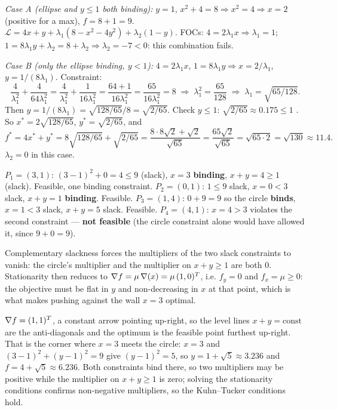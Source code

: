 \begin{solutions}
  \item \emph{Case A (ellipse and $y \leq 1$ both binding):} $y = 1$,
        $x^2 + 4 = 8 \Rightarrow x^2 = 4 \Rightarrow x = 2$ (positive for
        a max), $f = 8 + 1 = 9$.
        $\mathcal{L} = 4 x + y + \lambda_1(8 - x^2 - 4 y^2)
        + \lambda_2(1 - y)$. FOCs:
        $4 = 2 \lambda_1 x \Rightarrow \lambda_1 = 1$;
        $1 = 8 \lambda_1 y + \lambda_2 = 8 + \lambda_2 \Rightarrow
        \lambda_2 = -7 < 0$: this combination fails.

        \emph{Case B (only the ellipse binding, $y < 1$):}
        $4 = 2 \lambda_1 x$, $1 = 8 \lambda_1 y \Rightarrow
        x = 2/\lambda_1$, $y = 1/(8 \lambda_1)$. Constraint:
        \[
          \frac{4}{\lambda_1^2} + \frac{4}{64 \lambda_1^2}
          = \frac{4}{\lambda_1^2} + \frac{1}{16 \lambda_1^2}
          = \frac{64 + 1}{16 \lambda_1^2}
          = \frac{65}{16 \lambda_1^2} = 8
          \;\Rightarrow\; \lambda_1^2 = \frac{65}{128}
          \;\Rightarrow\; \lambda_1 = \sqrt{65/128} .
        \]
        Then $y = 1/(8 \lambda_1) = \sqrt{128/65}/8 = \sqrt{2/65}$. Check
        $y \leq 1$: $\sqrt{2/65} \approx 0.175 \leq 1$ \checkmark. So
        $x^* = 2 \sqrt{128/65}$, $y^* = \sqrt{2/65}$, and
        \[
          f^* = 4 x^* + y^*
              = 8 \sqrt{128/65} + \sqrt{2/65}
              = \frac{8 \cdot 8 \sqrt{2} + \sqrt{2}}{\sqrt{65}}
              = \frac{65 \sqrt{2}}{\sqrt{65}}
              = \sqrt{65 \cdot 2} = \sqrt{130} \approx 11.4 .
        \]
        $\lambda_2 = 0$ in this case.

  \item $P_{1}=(3,1)$: $(3-1)^{2}+0=4\le9$ (slack), $x=3$
        \textbf{binding}, $x+y=4\ge1$ (slack). Feasible, one binding
        constraint. \;$P_{2}=(0,1)$: $1\le9$ slack, $x=0<3$ slack,
        $x+y=1$ \textbf{binding}. Feasible. \;$P_{3}=(1,4)$:
        $0+9=9$ so the circle \textbf{binds}, $x=1<3$ slack, $x+y=5$
        slack. Feasible. \;$P_{4}=(4,1)$: $x=4>3$ violates the second
        constraint --- \textbf{not feasible} (the circle constraint alone
        would have allowed it, since $9+0=9$).
  \item Complementary slackness forces the multipliers of the two slack
        constraints to vanish: the circle's multiplier and the
        multiplier on $x+y\ge1$ are both $0$. Stationarity then reduces to
        $\nabla f=\mu\,\nabla(x)= \mu\,(1,0)^{T}$, i.e. $f_{y}=0$ and
        $f_{x}=\mu\ge0$: the objective must be flat in $y$ and
        non-decreasing in $x$ at that point, which is what makes pushing
        against the wall $x=3$ optimal.
  \item $\nabla f=(1,1)^{T}$, a constant arrow pointing up-right, so the
        level lines $x+y=\text{const}$ are the anti-diagonals and the
        optimum is the feasible point furthest up-right. That is the corner
        where $x=3$ meets the circle: $x=3$ and
        $(3-1)^{2}+(y-1)^{2}=9$ give $(y-1)^{2}=5$, so
        $y=1+\sqrt5\approx3.236$ and $f=4+\sqrt5\approx6.236$. Both
        constraints bind there, so two multipliers may be positive while
        the multiplier on $x+y\ge1$ is zero; solving the stationarity
        conditions confirms non-negative multipliers, so the Kuhn--Tucker
        conditions hold.


\end{solutions}
